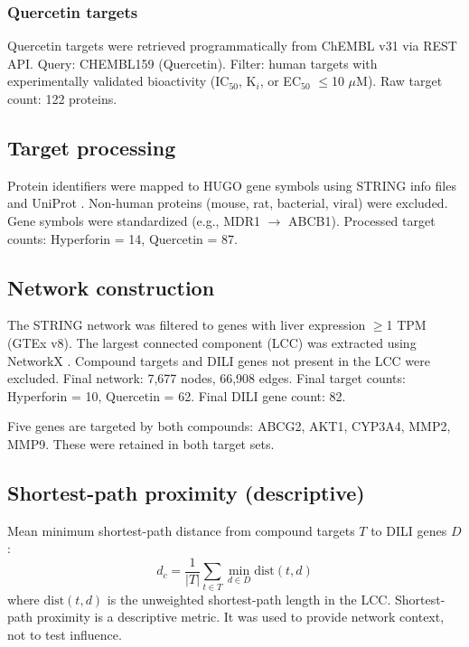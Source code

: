 \subsubsection{Quercetin targets}
Quercetin targets were retrieved programmatically from ChEMBL v31 \citep{Mendez2019} via REST API.
Query: CHEMBL159 (Quercetin).
Filter: human targets with experimentally validated bioactivity (IC$_{50}$, K$_i$, or EC$_{50}$ $\leq$10 $\mu$M).
Raw target count: 122 proteins.

\subsection{Target processing}

Protein identifiers were mapped to HUGO gene symbols using STRING info files and UniProt \citep{UniProt2023}.
Non-human proteins (mouse, rat, bacterial, viral) were excluded.
Gene symbols were standardized (e.g., MDR1 $\rightarrow$ ABCB1).
Processed target counts: Hyperforin = 14, Quercetin = 87.

\subsection{Network construction}

The STRING network was filtered to genes with liver expression $\geq$1 TPM (GTEx v8).
The largest connected component (LCC) was extracted using NetworkX \citep{Hagberg2008}.
Compound targets and DILI genes not present in the LCC were excluded.
Final network: 7,677 nodes, 66,908 edges.
Final target counts: Hyperforin = 10, Quercetin = 62.
Final DILI gene count: 82.

Five genes are targeted by both compounds: ABCG2, AKT1, CYP3A4, MMP2, MMP9.
These were retained in both target sets.

\subsection{Shortest-path proximity (descriptive)}

Mean minimum shortest-path distance from compound targets $T$ to DILI genes $D$:
\begin{equation}
    d_c = \frac{1}{|T|} \sum_{t \in T} \min_{d \in D} \text{dist}(t, d)
\end{equation}
where $\text{dist}(t, d)$ is the unweighted shortest-path length in the LCC.
Shortest-path proximity is a descriptive metric.
It was used to provide network context, not to test influence.

